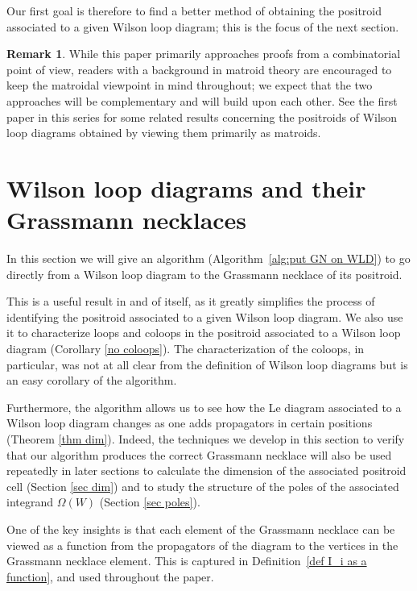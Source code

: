 \documentclass[11pt]{article}
\theoremstyle{remark}
\theoremstyle{definition}
\newtheorem{rmk}[thm]{Remark}
\begin{document}
Our first goal is therefore to find a better method of obtaining the positroid associated to a given Wilson loop diagram; this is the focus of the next section.

\begin{rmk}
While this paper primarily approaches proofs from a combinatorial point of view, readers with a background in matroid theory are encouraged to keep the matroidal viewpoint in mind throughout; we expect that the two approaches will be complementary and will build upon each other. See the first paper in this series \cite[section 3]{generalcombinatoricsI} for some related results concerning the positroids of Wilson loop diagrams obtained by viewing them primarily as matroids.
\end{rmk}




\section{Wilson loop diagrams and their Grassmann necklaces}\label{sec GN algorithm}



In this section we will give an algorithm (Algorithm~\ref{alg:put GN on WLD}) to go directly from a Wilson loop diagram to the Grassmann necklace of its positroid. 

This is a useful result in and of itself, as it greatly simplifies the process of identifying the positroid associated to a given Wilson loop diagram. We also use it to characterize loops and coloops in the positroid associated to a Wilson loop diagram (Corollary \ref{no coloops}).  The characterization of the coloops, in particular, was not at all clear from the definition of Wilson loop diagrams but is an easy corollary of the algorithm.

Furthermore, the algorithm allows us to see how the Le diagram associated to a Wilson loop diagram changes as one adds propagators in certain positions (Theorem \ref{thm dim}). Indeed, the techniques we develop in this section to verify that our algorithm produces the correct Grassmann necklace will also be used repeatedly in later sections to calculate the dimension of the associated positroid cell (Section \ref{sec dim}) and to study the structure of the poles of the associated integrand $\Omega(W)$ (Section \ref{sec poles}).

One of the key insights is that each element of the Grassmann necklace can be viewed as a function from the propagators of the diagram to the vertices in the Grassmann necklace element.  This is captured in Definition~\ref{def I_i as a function}, and used throughout the paper.
\end{document}
